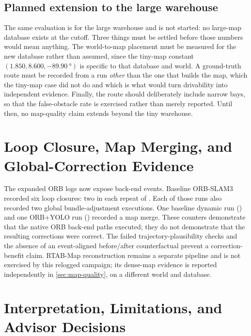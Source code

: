 \subsection{Planned extension to the large warehouse}

The same evaluation is  for the large warehouse and is not
started: no large-map database exists at the cutoff. Three things must be settled
before those numbers would mean anything. The world-to-map placement must be
measured for the new database rather than assumed, since the tiny-map constant
$(1.850, 8.600, \SI{-89.90}{\degree})$ is specific to that database and world. A
ground-truth route must be recorded from a run \emph{other} than the one that
builds the map, which the tiny-map case did not do and which is what would turn
drivability into independent evidence. Finally, the route should deliberately
include narrow bays, so that the false-obstacle rate is exercised rather than
merely reported. Until then,
no map-quality claim extends beyond the tiny warehouse.

\section{Loop Closure, Map Merging, and Global-Correction Evidence}
\label{sec:global-events}

The expanded ORB logs now expose back-end events. Baseline ORB-SLAM3 recorded six
loop closures: two in each repeat of
. Each of those runs also recorded two
global bundle-adjustment executions. One baseline dynamic run
() and one
ORB+YOLO run
() recorded a map
merge. These counters demonstrate that the native ORB back-end paths executed;
they do not demonstrate that the resulting corrections were correct. The
failed trajectory-plausibility checks and the absence of an event-aligned
before/after counterfactual prevent a correction-benefit claim. RTAB-Map reconstruction remains a separate pipeline and is not exercised by
this relogged campaign; its dense-map evidence is reported independently in
\cref{sec:map-quality}, on a different world and database.

\section{Interpretation, Limitations, and Advisor Decisions}
\label{sec:results-discussion}


